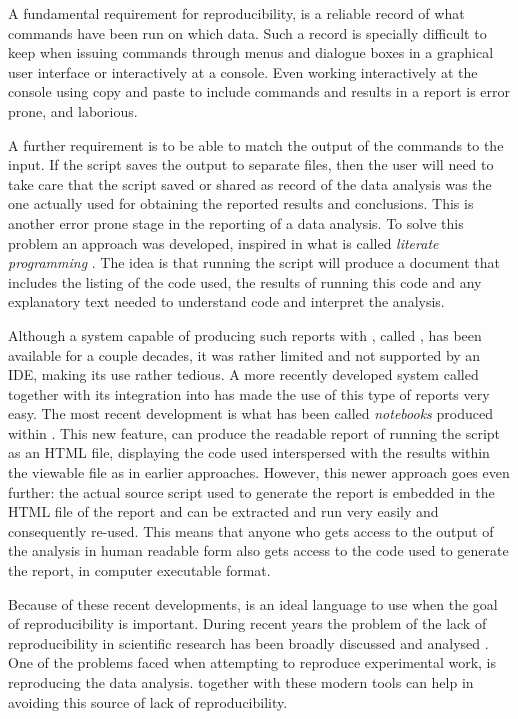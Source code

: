 \documentclass[krantz2]{krantz}\usepackage{knitr}%
\begin{document}
A fundamental requirement for reproducibility, is a reliable record of what commands have been run on which data. Such a record is specially difficult to keep when issuing commands through menus and dialogue boxes in a graphical user interface or interactively at a console. Even working interactively at the \Rpgrm console using copy and paste to include commands and results in a report is error prone, and laborious.

A further requirement is to be able to match the output of the \Rlang commands to the input. If the script saves the output to separate files, then the user will need to take care that the script saved or shared as record of the data analysis was the one actually used for obtaining the reported results and conclusions. This is another error prone stage in the reporting of a data analysis. To solve this problem an approach was developed, inspired in what is called \emph{literate programming} \autocite{Knuth1984a}. The idea is that running the script will produce a document that includes the listing of the \Rlang code used, the results of running this code and any explanatory text needed to understand code and interpret the analysis.

Although a system capable of producing such reports with \Rlang, called  \autocite{Leisch2002}, has been available for a couple decades, it was rather limited and not supported by an IDE, making its use rather tedious. A more recently developed system called  \autocite{Xie2013} together with its integration into \RStudio has made the use of this type of reports very easy. The most recent development is what has been called \Rlang \emph{notebooks} produced within \RStudio. This new feature, can produce the readable report of running the script as an HTML file, displaying the code used interspersed with the results within the viewable file as in earlier approaches. However, this newer approach goes even further: the actual source script used to generate the report is embedded in the HTML file of the report and can be extracted and run very easily and consequently re-used. This means that anyone who gets access to the output of the analysis in human readable form also gets access to the code used to generate the report, in computer executable format.

Because of these recent developments, \Rlang is an ideal language to use when the goal of reproducibility is important. During recent years the problem of the lack of reproducibility in scientific research has been broadly discussed and analysed \autocite{Gandrud2015}. One of the problems faced when attempting to reproduce experimental work, is reproducing the data analysis. \Rlang together with these modern tools can help in avoiding this source of lack of reproducibility.
\end{document}
